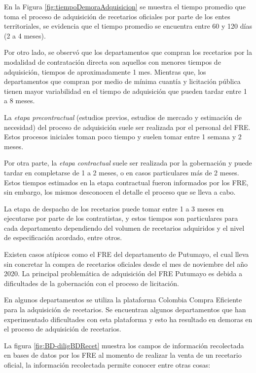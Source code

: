\documentclass[
]{book}
\begin{document}
En la Figura \ref{fig:tiempoDemoraAdquisicion} se muestra el tiempo promedio que toma el proceso de adquisición de recetarios oficiales por parte de los entes territoriales, se evidencia que el tiempo promedio se encuentra entre 60 y 120 días (2 a 4 meses).

Por otro lado, se observó que los departamentos que compran los recetarios por la modalidad de contratación directa son aquellos con menores tiempos de adquisición, tiempos de aproximadamente 1 mes. Mientras que, los departamentos que compran por medio de mínima cuantía y licitación pública tienen mayor variabilidad en el tiempo de adquisición que pueden tardar entre 1 a 8 meses.

La \emph{etapa precontractual} (estudios previos, estudios de mercado y estimación de necesidad) del proceso de adquisición suele ser realizada por el personal del FRE. Estos procesos iniciales toman poco tiempo y suelen tomar entre 1 semana y 2 meses.

Por otra parte, la \emph{etapa contractual} suele ser realizada por la gobernación y puede tardar en completarse de 1 a 2 meses, o en casos particulares más de 2 meses. Estos tiempos estimados en la etapa contractual fueron informados por los FRE, sin embargo, los mismos desconocen el detalle el proceso que se lleva a cabo.

La etapa de despacho de los recetarios puede tomar entre 1 a 3 meses en ejecutarse por parte de los contratistas, y estos tiempos son particulares para cada departamento dependiendo del volumen de recetarios adquiridos y el nivel de especificación acordado, entre otros.

Existen casos atípicos como el FRE del departamento de Putumayo, el cual lleva sin concretar la compra de recetarios oficiales desde el mes de noviembre del año 2020. La principal problemática de adquisición del FRE Putumayo es debida a dificultades de la gobernación con el proceso de licitación.

En algunos departamentos se utiliza la plataforma Colombia Compra Eficiente para la adquisición de recetarios. Se encuentran algunos departamentos que han experimentado dificultades con esta plataforma y esto ha resultado en demoras en el proceso de adquisición de recetarios.

La figura \ref{fig:BD-diligBDRecet} muestra los campos de información recolectada en bases de datos por los FRE al momento de realizar la venta de un recetario oficial, la información recolectada permite conocer entre otras cosas:
\end{document}
